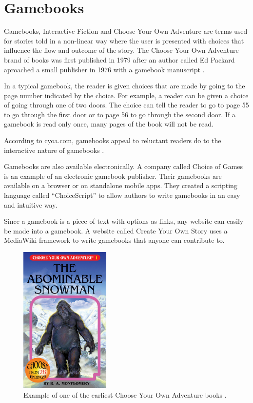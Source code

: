 \section{Gamebooks}

Gamebooks, Interactive Fiction and Choose Your Own Adventure are terms used for stories told in a non-linear way where the user is presented with choices that influence the flow and outcome of the story. The Choose Your Own Adventure brand of books was first published in 1979 after an author called Ed Packard aproached a small publisher in 1976 with a gamebook manuscript \cite{cyoa}.

In a typical gamebook, the reader is given choices that are made by going to the page number indicated by the choice. For example, a reader can be given a choice of going through one of two doors. The choice can tell the reader to go to page 55 to go through the first door or to page 56 to go through the second door. If a gamebook is read only once, many pages of the book will not be read.

According to cyoa.com, gamebooks appeal to reluctant readers do to the interactive nature of gamebooks \cite{cyoa}. 

Gamebooks are also available electronically. A company called Choice of Games \cite{CoG} is an example of an electronic gamebook publisher. Their gamebooks are available on a browser or on standalone mobile apps. They created a scripting language called ``ChoiceScript'' to allow authors to write gamebooks in an easy and intuitive way. 

Since a gamebook is a piece of text with options as links, any website can easily be made into a gamebook. A website called Create Your Own Story \cite{editthis} uses a MediaWiki \cite{mediawiki} framework to write gamebooks that anyone can contribute to.  

\begin{figure}
  \centering
  	\caption{Example of one of the earliest Choose Your Own Adventure books \cite{cyoa}.} 
    \includegraphics[width=0.4\textwidth]{figs/cyoa.jpg}
   
   \label{fig:cyoa_book}
\end{figure}

